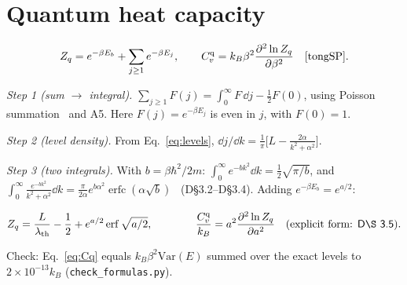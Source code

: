\documentclass[10pt]{article}
\providecommand{\erf}{\operatorname{erf}}
\providecommand{\erfc}{\operatorname{erfc}}
\newcommand{\lth}{\lambda_{\mathrm{th}}}
\newcommand{\Cq}{C_v^{\mathrm{q}}}
\newcommand{\kB}{k_{B}}
\newcommand{\D}[1]{\textsf{D\S#1}}
\newcommand{\step}[1]{\par\smallskip\textit{#1}\;}
\begin{document}
\section{Quantum heat capacity}
\begin{equation}
Z_q=e^{-\beta E_b}+\sum_{j\ge1}e^{-\beta E_j},\qquad \Cq=\kB\beta^2\pdv[2]{\ln Z_q}{\beta}\quad\text{\cite[p.~20, Eq.~(1.27)]{tongSP}}.
\label{eq:Zsum}
\end{equation}
\step{Step 1 (sum $\to$ integral).} $\sum_{j\ge1}F(j)=\int_0^\infty F\,\dd j-\tfrac12F(0)$, using Poisson summation~\cite[Eq.~(1.8.15)]{dlmf} and A5. Here $F(j)=e^{-\beta E_j}$ is even in $j$, with $F(0)=1$.
\step{Step 2 (level density).} From Eq.~\eqref{eq:levels}, $\dd j/\dd k=\frac1\pi\big[L-\frac{2\alpha}{k^2+\alpha^2}\big]$.
\step{Step 3 (two integrals).} With $b=\beta\hbar^2/2m$: $\int_0^\infty e^{-bk^2}\dd k=\frac12\sqrt{\pi/b}$, and $\int_0^\infty\frac{e^{-bk^2}}{k^2+\alpha^2}\dd k=\frac{\pi}{2\alpha}e^{b\alpha^2}\erfc(\alpha\sqrt b)$~\cite[Eq.~(7.7.1)]{dlmf} (\D{3.2}--\D{3.4}). Adding $e^{-\beta E_b}=e^{a/2}$:
\begin{keybox}
\vspace{-3mm}
\begin{equation}
Z_q=\frac{L}{\lth}-\frac12+e^{a/2}\erf\sqrt{a/2},\qquad\qquad
\frac{\Cq}{\kB}=a^2\pdv[2]{\ln Z_q}{a}\quad(\text{explicit form: \D{3.5}}).
\label{eq:Cq}
\end{equation}
\end{keybox}
Check: Eq.~\eqref{eq:Cq} equals $\kB\beta^2\mathrm{Var}(E)$ summed over the exact levels to $2\times10^{-13}\kB$ (\texttt{check\_formulas.py}).
\end{document}
